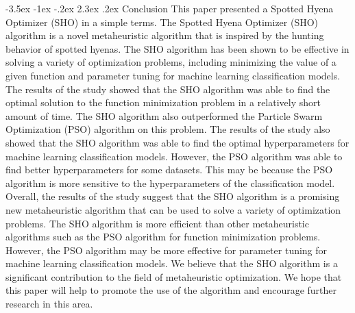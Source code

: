 \documentclass[12pt]{article}
\makeatletter
\renewcommand\section{\@startsection {section}{1}{1em}%
                                   {-3.5ex \@plus -1ex \@minus -.2ex}%
                                   {2.3ex \@plus.2ex}%
                                   {\normalfont\fontsize{14}{16}\bfseries}}
\makeatother
\begin{document}
\section{Conclusion}
This paper presented a Spotted Hyena Optimizer (SHO) in a simple terms. 
The Spotted Hyena Optimizer (SHO) algorithm is a novel metaheuristic algorithm that is inspired by the hunting behavior of spotted hyenas. The SHO algorithm has been shown to be effective in solving a variety of optimization problems, including minimizing the value of a given function and parameter tuning for machine learning classification models.
The results of the study showed that the SHO algorithm was able to find the optimal solution to the function minimization problem in a relatively short amount of time. The SHO algorithm also outperformed the Particle Swarm Optimization (PSO) algorithm on this problem.
The results of the study also showed that the SHO algorithm was able to find the optimal hyperparameters for machine learning classification models. However, the PSO algorithm was able to find better hyperparameters for some datasets. This may be because the PSO algorithm is more sensitive to the hyperparameters of the classification model.
Overall, the results of the study suggest that the SHO algorithm is a promising new metaheuristic algorithm that can be used to solve a variety of optimization problems. The SHO algorithm is more efficient than other metaheuristic algorithms such as the PSO algorithm for function minimization problems. However, the PSO algorithm may be more effective for parameter tuning for machine learning classification models.
We believe that the SHO algorithm is a significant contribution to the field of metaheuristic optimization. We hope that this paper will help to promote the use of the algorithm and encourage further research in this area.

\clearpage %
\printbibliography %
\end{document}
